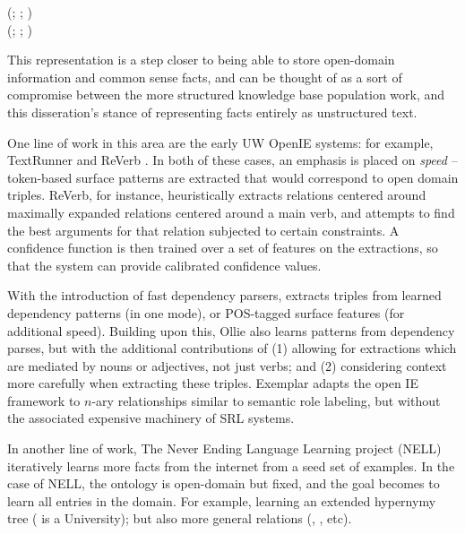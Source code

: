 \begin{displayquote}
  (; ; ) \\
  (; ; )
\end{displayquote}

This representation is a step closer to being able to store open-domain information
  and common sense facts, and can be thought of as a sort of compromise between
  the more structured knowledge base population work, and this disseration's stance
  of representing facts entirely as unstructured text.

One line of work in this area are the early UW OpenIE systems: for example,
  TextRunner \cite{key:2007yates-textrunner} and
  ReVerb \cite{key:2011fader-reverb}.
In both of these cases, an emphasis is placed on \textit{speed} --
  token-based surface patterns are extracted that would correspond to
  open domain triples.
ReVerb, for instance, heuristically extracts relations centered around maximally expanded
  relations centered around a main verb, and attempts to find the best arguments
  for that relation subjected to certain constraints.
A confidence function is then trained over a set of features on the extractions, so that
  the system can provide calibrated confidence values.

With the introduction of fast dependency parsers,
  \cite{key:2010wu-openie} extracts triples from
  learned dependency patterns (in one mode), or POS-tagged surface features (for additional
  speed).
Building upon this, Ollie \cite{key:2012mausam-ollie} also learns patterns from dependency
  parses, but with the additional contributions of (1) allowing for extractions which are
  mediated by nouns or adjectives, not just verbs; and (2) considering context more carefully
  when extracting these triples.
Exemplar \cite{key:2013mesquita-exemplar} adapts the open IE framework to
  $n$-ary relationships similar to semantic role labeling, but without the
  associated expensive machinery of SRL systems.

In another line of work, The Never Ending Language Learning project (NELL) \cite{key:2010carlson-nell}
  iteratively learns more facts from the internet
  from a seed set of examples.
In the case of NELL, the ontology is open-domain but fixed, and the goal becomes to learn
  all entries in the domain.
For example, learning an extended hypernymy tree ( is a University);
  but also more general relations (, , etc).


